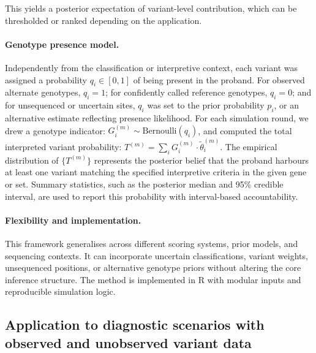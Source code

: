 This yields a posterior expectation of variant-level contribution, which can be thresholded or ranked depending on the application.

\paragraph{Genotype presence model.}
Independently from the classification or interpretive context, each variant was assigned a probability \( q_i \in [0,1] \) of being present in the proband. For observed alternate genotypes, \( q_i = 1 \); for confidently called reference genotypes, \( q_i = 0 \); and for unsequenced or uncertain sites, \( q_i \) was set to the prior probability \( p_i \), or an alternative estimate reflecting presence likelihood.
For each simulation round, we drew a genotype indicator:
$G_i^{(m)} \sim \text{Bernoulli}(q_i)$,
and computed the total interpreted variant probability:
$
T^{(m)} = \sum_i G_i^{(m)} \cdot \tilde{\theta}_i^{(m)}$.
The empirical distribution of \( \{T^{(m)}\} \) represents the posterior belief that the proband harbours at least one variant matching the specified interpretive criteria in the given gene or set. Summary statistics, such as the posterior median and 95\% credible interval, are used to report this probability with interval-based accountability.

\paragraph{Flexibility and implementation.}
This framework generalises across different scoring systems, prior models, and sequencing contexts. It can incorporate uncertain classifications, variant weights, unsequenced positions, or alternative genotype priors without altering the core inference structure. The method is implemented in R with modular inputs and reproducible simulation logic.

\subsection{Application to diagnostic scenarios with observed and unobserved variant data}

